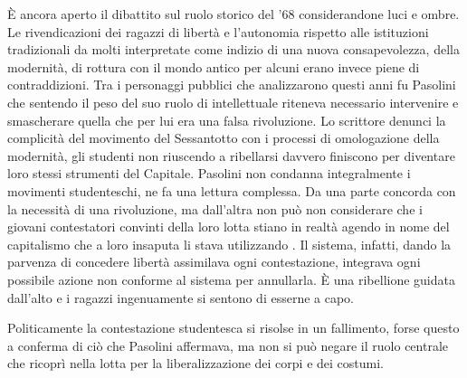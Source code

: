 È ancora aperto il dibattito sul ruolo storico del '68 considerandone luci e ombre. 
Le rivendicazioni dei ragazzi di libertà e l'autonomia rispetto alle istituzioni tradizionali da molti interpretate come indizio di una nuova consapevolezza, della modernità, di rottura con il mondo antico per alcuni erano invece piene di contraddizioni.
Tra i personaggi pubblici che analizzarono questi anni fu Pasolini che sentendo il peso del suo ruolo di intellettuale riteneva necessario intervenire e smascherare quella che per lui era una falsa rivoluzione.
Lo scrittore denunci la complicità del movimento del Sessantotto con i processi di omologazione della modernità, gli studenti non riuscendo a ribellarsi davvero finiscono per diventare loro stessi strumenti del Capitale.
Pasolini non condanna integralmente i movimenti studenteschi, ne fa una lettura complessa.
Da una parte concorda con la necessità di una rivoluzione, ma dall'altra non può non considerare che i giovani contestatori convinti della loro lotta stiano in realtà agendo in nome del capitalismo che a loro insaputa li stava utilizzando .
Il sistema, infatti, dando la parvenza di concedere libertà assimilava ogni contestazione, integrava ogni possibile azione non conforme al sistema  per annullarla.
È una ribellione guidata dall'alto e i ragazzi ingenuamente si sentono di esserne a capo.

Politicamente la contestazione studentesca si risolse in un fallimento, forse questo a conferma di ciò che Pasolini affermava, ma non si può negare il ruolo centrale che ricoprì nella lotta per la liberalizzazione dei corpi e dei costumi. 

